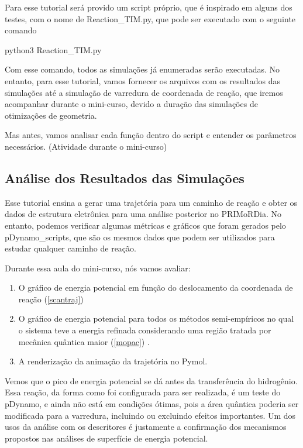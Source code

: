 \documentclass[a4paper,11pt]{refart}
\begin{document}
 Para esse tutorial será provido um script próprio, que é inspirado em alguns dos testes, com o nome de Reaction\_TIM.py, que pode ser executado com o seguinte comando 
	
	
	\hspace*{-\leftmarginwidth}
	\begin{minipage}{\fullwidth}
		\begin{commandshell}python3 Reaction_TIM.py\end{commandshell}
	\end{minipage}

	Com esse comando, todos as simulações já enumeradas serão executadas. No entanto, para esse tutorial, vamos fornecer os arquivos com os resultados das simulações até a simulação de varredura de coordenada de reação, que iremos acompanhar durante o mini-curso, devido a duração das simulações de otimizações de geometria. 
	
	Mas antes, vamos analisar cada função dentro do script e entender os parâmetros necessários. (Atividade durante o mini-curso)
	
	
	\subsection{Análise dos Resultados das Simulações}
	
	Esse tutorial ensina a gerar uma trajetória para um caminho de reação e obter os dados de estrutura eletrônica para uma análise posterior no PRIMoRDia. No entanto, podemos verificar algumas métricas e gráficos que foram gerados pelo pDynamo\_scripts, que são os mesmos dados que podem ser utilizados para estudar qualquer caminho de reação. 
	
	Durante essa aula do mini-curso, nós vamos avaliar:
	
	\begin{enumerate}
		\item O gráfico de energia potencial em função do deslocamento da coordenada de reação (\autoref{scantraj})
		\item O gráfico de energia potencial para todos os métodos semi-empíricos no qual o sistema teve a energia refinada considerando uma região tratada por mecânica quântica maior (\autoref{mopac}) .
		\item A renderização da animação da trajetória no Pymol.
	\end{enumerate}
	
	Vemos que o pico de energia potencial se dá antes da transferência do hidrogênio. Essa reação, da forma como foi configurada para ser realizada, é um teste do pDynamo, e ainda não está em condições ótimas, pois a área quântica poderia ser modificada para a varredura, incluindo ou excluindo efeitos importantes. Um dos usos da análise com os descritores é justamente a confirmação dos mecanismos propostos nas análises de superfície de energia potencial.
	
\end{document}
